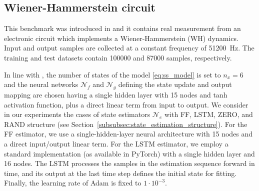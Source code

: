 \documentclass{article}
\newcommand{\NN}{\mathcal{N}} %
\begin{document}
\subsection{Wiener-Hammerstein circuit}
This benchmark was introduced in \cite{ljung2009wiener} and it contains real measurement from an electronic circuit which implements a Wiener-Hammerstein (WH) dynamics. 
Input and output samples are collected at a constant frequency of 51200~Hz. The training and test datasets contain 100000  and 87000 samples, respectively.

In line with \cite{beintema2021nonlinear}, the number of states of the model  \eqref{eq:ss_model} is set to $n_x=6$ and the neural networks $\NN_f$ and $\NN_g$ defining the state update and output mapping are chosen having a single hidden layer with 15 nodes and $\mathrm{tanh}$ activation function, plus a direct linear term from input to output. 
We consider in our experiments the cases of state estimators $
\NN_e$ with FF, LSTM, ZERO, and RAND structure (see Section~\ref{subsubsec:state_estimation_structure}). For the FF estimator,
we use a single-hidden-layer neural architecture with 15 nodes and a direct input/output linear term. For the LSTM estimator, we employ 
a standard implementation (as available in PyTorch) with a single hidden layer and 16 nodes. The LSTM processes the samples in the estimation sequence forward in time, and its output at the last time step defines the initial state for fitting. Finally, the learning rate of Adam is fixed to $1\cdot 10^{-3}$. 
\end{document}
